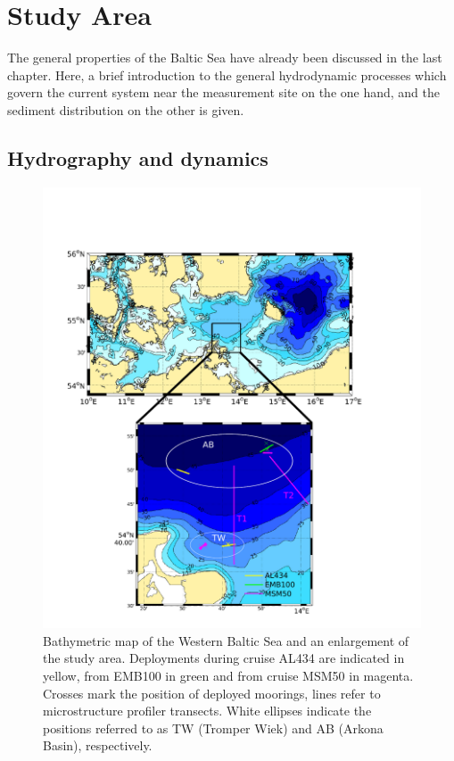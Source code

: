 \section{Study Area}

The general properties of the Baltic Sea have already been discussed in the 
last chapter. Here, a brief introduction to the general hydrodynamic 
processes which govern the current system near the measurement site on the one 
hand, and the sediment distribution on the other is given.

\subsection{Hydrography and dynamics} 

 \begin{figure}[ht]
 \centering
\includegraphics[width=18cm]{bilder/studyarea.pdf}
 \caption{Bathymetric map of the Western Baltic Sea and an enlargement of the 
study area. Deployments during cruise AL434 are indicated in yellow, from 
EMB100 in green and from cruise MSM50 in magenta. Crosses mark the 
position of deployed moorings, lines refer to microstructure profiler 
transects. White ellipses indicate the positions referred to as TW (Tromper 
Wiek) and AB (Arkona Basin), respectively.}
 \label{studyarea}
 \end{figure}

